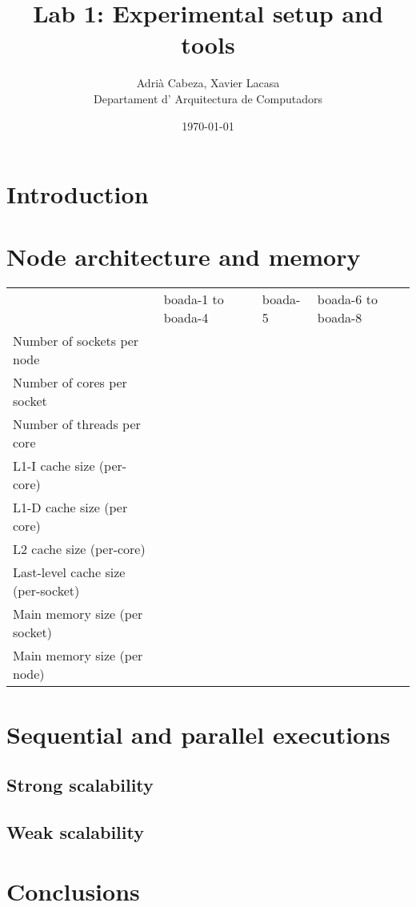 \documentclass[12]{article}
\author{Adrià Cabeza, Xavier Lacasa \\ Departament d' Arquitectura de Computadors}
\title{Lab 1: Experimental setup and tools}
\date{\today}
\begin{document}
\maketitle
\newpage
\tableofcontents
\newpage
\section{Introduction}
\section{Node architecture and memory}



\begin{table}[h]
    \begin{tabular}{llll}
                               & boada-1 to boada-4 & boada-5 & boada-6 to boada-8   \\
    Number of sockets per node &                    &         &                      \\
    Number of cores per socket &                    &         &                      \\
    Number of threads per core &                    &         &                     \\
    L1-I cache size (per-core) &                    &         &                      \\
    L1-D cache size (per core) &                    &         &                      \\
    L2 cache size (per-core)   &                    &         &                       \\
    Last-level cache size (per-socket) &            &         &                      \\
    Main memory  size (per socket) &                &         &                       \\
    Main memory size (per node)  &                    &         &                       \\
    \end{tabular}
\end{table}




\section{Sequential and parallel executions}
\subsection{Strong scalability}
\subsection{Weak scalability}
\section{Conclusions}
\end{document}
